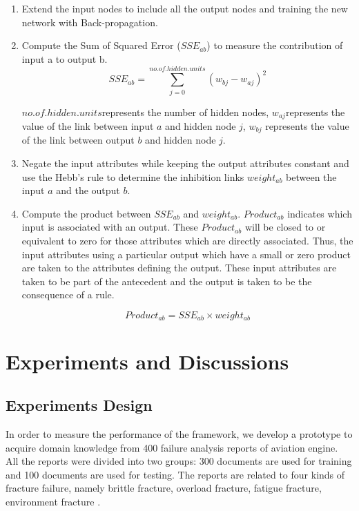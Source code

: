 \documentclass{elsart}
\begin{document}
\begin{enumerate}
\item Extend the input nodes to include all the output nodes and
  training the new network with Back-propagation.
\item Compute the Sum of Squared Error ($SSE_{ab}$) to measure the
  contribution of input a to output b.
  \begin{equation}
    \label{eq:2}
    SSE_{ab} = \sum_{j=0}^{no.of.hidden.units}{(w_{bj}-w_{aj})}^2
  \end{equation}

$no.of.hidden.units$represents the number of hidden nodes,
$w_{aj}$represents the value of the link between input $a$ and hidden
node $j$, $w_{bj}$ represents the value of the link between output $b$
and hidden node $j$. 
\item  Negate the input attributes while keeping the output attributes
constant and use the Hebb’s rule to determine the inhibition links
$weight_{ab}$ between the input $a$ and the output $b$.
\item Compute the product between $SSE_{ab}$ and
$weight_{ab}$. $Product_{ab}$ indicates which input is associated with
an output. These $Product_{ab}$ will be closed to or equivalent to
zero for those attributes which are directly associated. Thus, the
input attributes using a particular output which have a small or zero
product are taken to the attributes defining the output. These input
attributes are taken to be part of the antecedent and the output is
taken to be the consequence of a rule. 

\begin{equation}
  \label{eq:3}
  Product_{ab} = SSE_{ab}\times weight_{ab}
\end{equation}


\end{enumerate}

\section{Experiments and Discussions }
\label{sec:exper-disc-}

\subsection{Experiments Design
}
\label{sec:experiments-design-}

In order to measure the performance of the framework, we develop a
prototype  to acquire domain
knowledge from 400 failure analysis reports of aviation engine. All
the reports were divided into two groups: 300 documents are used for
training and 100 documents are used for testing. The reports are
related to four kinds of fracture failure, namely brittle fracture,
overload fracture, fatigue fracture, environment fracture
\cite{medema}.
\end{document}
